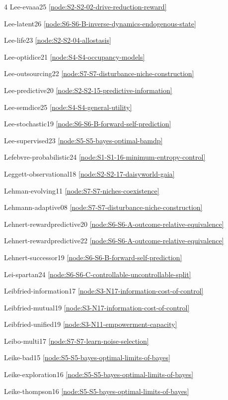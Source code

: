 \documentclass[10pt]{article}
\begin{document}
{\begin{multicols}{4}
Lee-evaaa25 \hfill \ref{node:S2-S2-02-drive-reduction-reward}\par
Lee-latent26 \hfill \ref{node:S6-S6-B-inverse-dynamics-endogenous-state}\par
Lee-life23 \hfill \ref{node:S2-S2-04-allostasis}\par
Lee-optidice21 \hfill \ref{node:S4-S4-occupancy-models}\par
Lee-outsourcing22 \hfill \ref{node:S7-S7-disturbance-niche-construction}\par
Lee-predictive20 \hfill \ref{node:S2-S2-15-predictive-information}\par
Lee-semdice25 \hfill \ref{node:S4-S4-general-utility}\par
Lee-stochastic19 \hfill \ref{node:S6-S6-B-forward-self-prediction}\par
Lee-supervised23 \hfill \ref{node:S5-S5-bayes-optimal-bamdp}\par
Lefebvre-probabilistic24 \hfill \ref{node:S1-S1-16-minimum-entropy-control}\par
Leggett-observational18 \hfill \ref{node:S2-S2-17-daisyworld-gaia}\par
Lehman-evolving11 \hfill \ref{node:S7-S7-niches-coexistence}\par
Lehmann-adaptive08 \hfill \ref{node:S7-S7-disturbance-niche-construction}\par
Lehnert-rewardpredictive20 \hfill \ref{node:S6-S6-A-outcome-relative-equivalence}\par
Lehnert-rewardpredictive22 \hfill \ref{node:S6-S6-A-outcome-relative-equivalence}\par
Lehnert-successor19 \hfill \ref{node:S6-S6-B-forward-self-prediction}\par
Lei-spartan24 \hfill \ref{node:S6-S6-C-controllable-uncontrollable-split}\par
Leibfried-information17 \hfill \ref{node:S3-N17-information-cost-of-control}\par
Leibfried-mutual19 \hfill \ref{node:S3-N17-information-cost-of-control}\par
Leibfried-unified19 \hfill \ref{node:S3-N11-empowerment-capacity}\par
Leibo-multi17 \hfill \ref{node:S7-S7-learn-noise-selection}\par
Leike-bad15 \hfill \ref{node:S5-S5-bayes-optimal-limits-of-bayes}\par
Leike-exploration16 \hfill \ref{node:S5-S5-bayes-optimal-limits-of-bayes}\par
Leike-thompson16 \hfill \ref{node:S5-S5-bayes-optimal-limits-of-bayes}\par

\end{multicols}}
\end{document}
